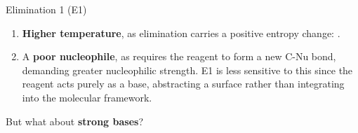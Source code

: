 \documentclass[10pt]{article}
\begin{document}
\begin{core}{Elimination 1 (E1)}
    \begin{enumerate}


\item \textbf{Higher temperature}, as elimination carries a positive entropy change: .

\item A \textbf{poor nucleophile}, as \sno requires the reagent to form a new C-Nu bond, demanding greater nucleophilic strength. E1 is less sensitive to this since the reagent acts purely as a base, abstracting a surface  rather than integrating into the molecular framework.

    
\end{enumerate}

    But what about \textbf{strong bases}?

  \end{core}
\end{document}
